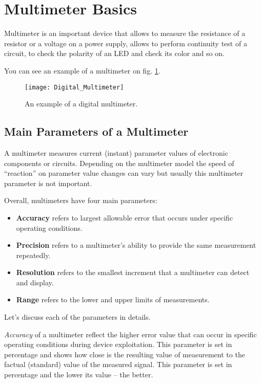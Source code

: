 \documentclass[../main.tex]{subfiles}
\begin{document}
\section{Multimeter Basics}

Multimeter is an important device that allows to measure the resistance of a
resistor or a voltage on a power supply, allows to perform continuity test of a
circuit, to check the polarity of an LED and check its color and so on.

You can see an example of a multimeter on fig. \ref{fig:multimeter-example}.

\begin{figure}[ht]
  \centering
  \texttt{[image: Digital\_Multimeter]}
  \caption{An example of a digital multimeter.}
  \label{fig:multimeter-example}
\end{figure}

\subsection{Main Parameters of a Multimeter}

A multimeter measures current (instant) parameter values of electronic
components or circuits.  Depending on the multimeter model the speed of
``reaction'' on parameter value changes can vary but usually this multimeter
parameter is not important.

Overall, multimeters have four\cite{fluke:multimeter} main parameters:
\begin{itemize}
\item \textbf{Accuracy} refers to largest allowable error that occurs under
  specific operating conditions.
\item \textbf{Precision} refers to a multimeter's ability to provide the same
  measurement repeatedly.
\item \textbf{Resolution} refers to the smallest increment that a multimeter can
  detect and display.
\item \textbf{Range} refers to the lower and upper limits of measurements.
\end{itemize}

Let's discuss each of the parameters in details.

\emph{Accuracy} of a multimeter reflect the higher error value that can occur in
specific operating conditions during device exploitation.  This parameter is set
in percentage and shows how close is the resulting value of measurement to the
factual (standard) value of the measured signal.  This parameter is set in
percentage and the lower its value -- the better.
\end{document}
